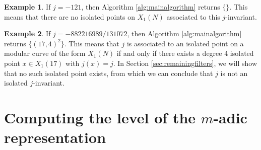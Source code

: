 \documentclass[11pt,reqno]{amsart}
\theoremstyle{plain}
\newtheorem{theorem}{Theorem}%
\theoremstyle{definition}
\newtheorem{example}[theorem]{Example}
\newcommand{\Q}{\bQ}
\newcommand{\abbey}[1]{\textcolor{blue}{Abbey: #1}}
\newcommand{\timo}[1]{\textcolor{red}{Timo: #1}}
\begin{document}
\begin{example}
If $j=-121$, then Algorithm \ref{alg:mainalgorithm} returns $\{\}$. This means that there are no isolated points on $X_1(N)$ associated to this $j$-invariant.
\end{example}

\begin{example}
If $j=-882216989/131072$, then Algorithm \ref{alg:mainalgorithm} returns  $\{( 17,4) ^2\}$. This means that $j$ is associated to an isolated point on a modular curve of the form $X_1(N)$ if and only if there exists a degree 4 isolated point $x \in X_1(17)$ with $j(x)=j$. In Section \ref{sec:remainingfilters}, we will show that no such isolated point exists, from which we can conclude that $j$ is not an isolated $j$-invariant.
\end{example}





\section{\texorpdfstring{Computing the level of the $m$-adic representation}{Computing the level of the m-adic representation}}
\label{sec:madicrep}
\end{document}
